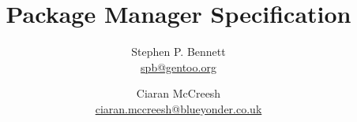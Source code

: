 \documentclass[a4paper]{report}
\title{Package Manager Specification}
\author{Stephen P. Bennett\\\url{spb@gentoo.org}
\and Ciaran McCreesh\\\url{ciaran.mccreesh@blueyonder.co.uk}}
\begin{document}
\maketitle

\tableofcontents
\listofalgorithms
\lstlistoflistings
\listoftables
\listoffixmes
































\end{document}
